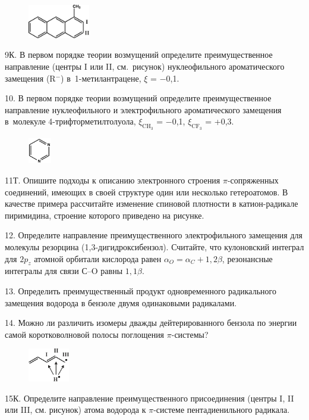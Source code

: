 \begin{figure} %
    \centering
    \vspace{-4ex}
    \includegraphics[width=27mm]{images/Fig_1_9_9.png}
    \vspace{-3ex}
\end{figure}
9К. В первом порядке теории возмущений определите преимущественное направление (центры I или II, см.~рисунок) нуклеофильного ароматического замещения (R$^-$) в~1-метилантрацене, $\xi$ = $-$0,1.
\par
10. В первом порядке теории возмущений определите преимущественное направление нуклеофильного и электрофильного ароматического замещения в~молекуле 4-трифторметилтолуола, $\xi_{\text{CH}_3}$ = $-$0,1, $\xi_{\text{CF}_3}$ = +0,3.
\par
\begin{figure} %
    \centering
    \vspace{-3ex}
    \includegraphics[width=10mm]{images/Fig_1_9_11.png}
    \vspace{-4ex}
\end{figure}
11Т. Опишите подходы к описанию электронного строения $\pi$-сопряженных соединений, имеющих в своей структуре один или несколько гетероатомов. В качестве примера рассчитайте изменение спиновой плотности в катион-радикале пиримидина, строение которого приведено на рисунке.
\par
12. Определите направление преимущественного электрофильного замещения для молекулы резорцина (1,3-дигидроксибензол). Считайте, что кулоновский интеграл для $2p_z$ атомной орбитали кислорода равен $\alpha_O=\alpha_C+1,2\beta$, резонансные интегралы для связи С–O равны $1,1\beta$.
\par
13. Определить преимущественный продукт одновременного радикального замещения водорода в бензоле двумя одинаковыми радикалами.
\par
14. Можно ли различить изомеры дважды дейтерированного бензола по энергии самой коротковолновой полосы поглощения $\pi$-системы?
\par
\begin{figure} %
    \centering
    \vspace{-4ex}
    \includegraphics[width=18mm]{images/Fig_1_9_15.png}
    \vspace{-4ex}
\end{figure}
15К. Определите направление преимущественного присоединения (центры I, II или III, см. рисунок) атома водорода к $\pi$-системе пентадиенильного радикала.
\par